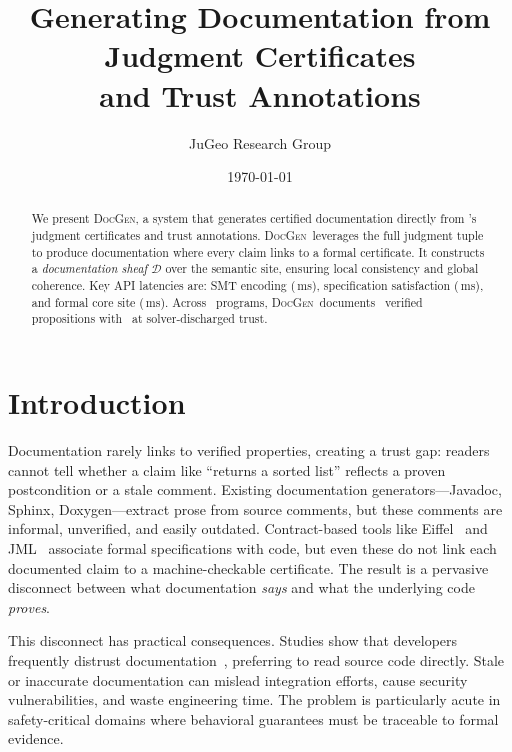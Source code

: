 \documentclass[11pt]{article}
\title{\textbf{Generating Documentation from Judgment Certificates\\
and Trust Annotations}}
\author{%
  JuGeo Research Group
}
\date{\today}
\newcommand{\DocGen}{\textsc{DocGen}}
\newcommand{\DocSheaf}{\mathcal{D}}
\begin{document}
\maketitle

\begin{abstract}
We present \DocGen, a system that generates certified documentation
directly from \JuGeo's judgment certificates and trust annotations.
\DocGen\ leverages the full judgment tuple to produce documentation
where every claim links to a formal certificate.  It constructs a
\emph{documentation sheaf} $\DocSheaf$ over the semantic site, ensuring
local consistency and global coherence.  Key API latencies are:
SMT encoding (\compProfEncodeForSolverMeanMs\,ms),
specification satisfaction (\compProfSpecificationSatisfactionMeanMs\,ms),
and formal core site (\compProfFormalCoreSiteMeanMs\,ms).
Across \ppLIXtotalPrograms\ programs, \DocGen\ documents
\ppLIXtotalPropsOk\ verified propositions with
\ppLIXtrustSolverPct\ at solver-discharged trust.
\end{abstract}

\newpage

\section{Introduction}\label{sec:intro}

Documentation rarely links to verified properties, creating a trust
gap: readers cannot tell whether a claim like ``returns a sorted list''
reflects a proven postcondition or a stale comment.  Existing
documentation generators---Javadoc, Sphinx, Doxygen---extract prose
from source comments, but these comments are informal, unverified, and
easily outdated.  Contract-based tools like Eiffel~\cite{Meyer1997}
and JML~\cite{JML2005} associate formal specifications with code, but
even these do not link each documented claim to a machine-checkable
certificate.  The result is a pervasive disconnect between what
documentation \emph{says} and what the underlying code \emph{proves}.

This disconnect has practical consequences.  Studies show that
developers frequently distrust documentation~\cite{Forward2002},
preferring to read source code directly.  Stale or inaccurate
documentation can mislead integration efforts, cause security
vulnerabilities, and waste engineering time.  The problem is
particularly acute in safety-critical domains where behavioral
guarantees must be traceable to formal evidence.
\end{document}

